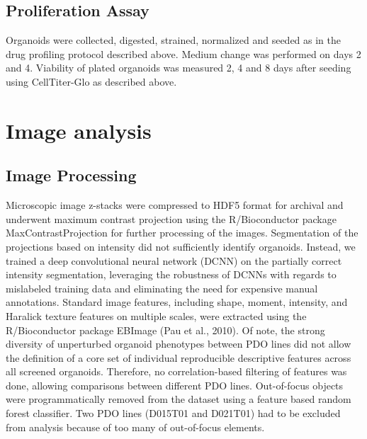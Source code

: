 \begin{flushleft}
\subsection{Proliferation Assay}
Organoids were collected, digested, strained, normalized and seeded as in the drug profiling protocol described above. Medium change was performed on days 2 and 4. Viability of plated organoids was measured 2, 4 and 8 days after seeding using CellTiter-Glo as described above.

\section{Image analysis}

\subsection{Image Processing}
Microscopic image z-stacks were compressed to HDF5 format for archival and underwent maximum contrast projection using the R/Bioconductor package MaxContrastProjection for further processing of the images. Segmentation of the projections based on intensity did not sufficiently identify organoids. Instead, we trained a deep convolutional neural network (DCNN) on the partially correct intensity segmentation, leveraging the robustness of DCNNs with regards to mislabeled training data and eliminating the need for expensive manual annotations. Standard image features, including shape, moment, intensity, and Haralick texture features on multiple scales, were extracted using the R/Bioconductor package EBImage (Pau et al., 2010). Of note, the strong diversity of unperturbed organoid phenotypes between PDO lines did not allow the definition of a core set of individual reproducible descriptive features across all screened organoids. Therefore, no correlation-based filtering of features was done, allowing comparisons between different PDO lines. Out-of-focus objects were programmatically removed from the dataset using a feature based random forest classifier. Two PDO lines (D015T01 and D021T01) had to be excluded from analysis because of too many of out-of-focus elements.


\end{flushleft}
